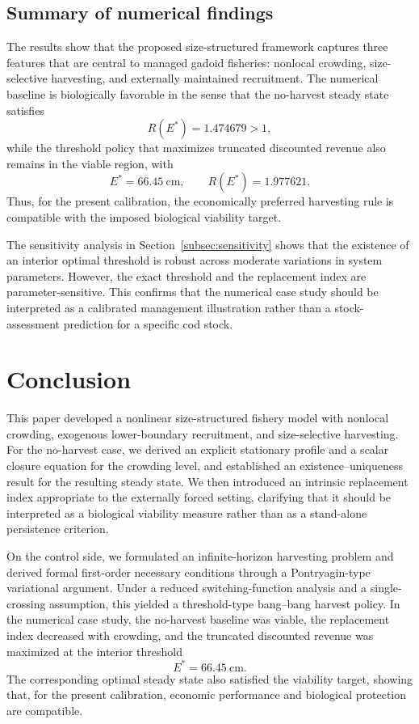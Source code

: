 \documentclass[pdflatex,sn-mathphys-num]{sn-jnl}
\theoremstyle{thmstyleone}
\theoremstyle{definition}
\theoremstyle{remark}
\begin{document}
\subsection{Summary of numerical findings}

The results show that the proposed size-structured framework captures three
features that are central to managed gadoid fisheries: nonlocal crowding,
size-selective harvesting, and externally maintained recruitment. The numerical
baseline is biologically favorable in the sense that the no-harvest steady
state satisfies
\[
R(E^*)=1.474679>1,
\]
while the threshold policy that maximizes truncated discounted revenue also
remains in the viable region, with
\[
E^*=66.45\ \text{cm},\qquad
R(E^*)=1.977621.
\]
Thus, for the present calibration, the economically preferred harvesting rule
is compatible with the imposed biological viability target.

The sensitivity analysis in Section~\ref{subsec:sensitivity} shows that the
existence of an interior optimal threshold is robust across moderate variations
in system parameters. However, the exact threshold and the replacement index are parameter-sensitive. This confirms that the numerical
case study should be interpreted as a calibrated management illustration rather
than a stock-assessment prediction for a specific cod stock.

\section{Conclusion}\label{sec:conclusion}

This paper developed a nonlinear size-structured fishery model with nonlocal
crowding, exogenous lower-boundary recruitment, and size-selective harvesting.
For the no-harvest case, we derived an explicit stationary profile and a scalar
closure equation for the crowding level, and established an
existence--uniqueness result for the resulting steady state. We then introduced
an intrinsic replacement index appropriate to the externally forced setting,
clarifying that it should be interpreted as a biological viability measure
rather than as a stand-alone persistence criterion.

On the control side, we formulated an infinite-horizon harvesting problem and
derived formal first-order necessary conditions through a Pontryagin-type
variational argument. Under a reduced switching-function analysis and a
single-crossing assumption, this yielded a threshold-type bang--bang harvest
policy. In the numerical case study, the no-harvest baseline was viable, the
replacement index decreased with crowding, and the truncated discounted revenue
was maximized at the interior threshold
\[
E^*=66.45\ \text{cm}.
\]
The corresponding optimal steady state also satisfied the viability target,
showing that, for the present calibration, economic performance and biological
protection are compatible.
\end{document}
